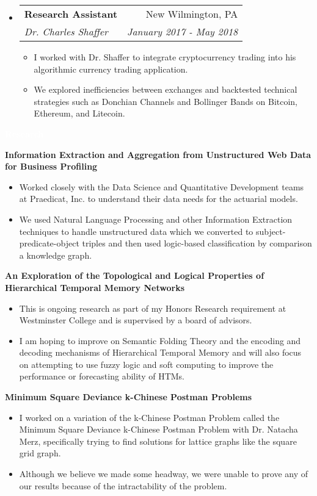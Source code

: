 \documentclass[letterpaper,11pt]{article}
\makeatletter
\newcommand{\resitem}[1]{\item #1 \vspace{-2pt}}
\newcommand{\resheading}[1]{{\large \colorbox{mypurple}{\begin{minipage}{\textwidth}{\textbf{#1 \vphantom{p\^{E}}}}\end{minipage}}}}
\newcommand{\ressubheading}[4]{
	\begin{tabular*}{7.0in}{l@{\extracolsep{\fill}}r}
		\textbf{#1} & #2 \\
		\textit{#3} & \textit{#4} \\
	\end{tabular*}\vspace{-6pt}}
\makeatother
\begin{document}
\begin{itemize}
		\item
		\ressubheading{Research Assistant}{New Wilmington, PA}{Dr. Charles Shaffer}{January 2017 - May 2018}
		\begin{itemize}
			\resitem{I worked with Dr. Shaffer to integrate cryptocurrency trading into his algorithmic currency trading application.}
			\resitem{We explored inefficiencies between exchanges and backtested technical strategies such as Donchian Channels and Bollinger Bands on Bitcoin, Ethereum, and Litecoin.}
		\end{itemize}
		
		\pagebreak
		
	\end{itemize}
	
	\resheading{\textcolor{white}{Research}}
	
		\vspace{0.1in}

		\textbf{Information Extraction and Aggregation from Unstructured Web Data for Business Profiling}
		\begin{itemize}
			\resitem{Worked closely with the Data Science and Quantitative Development teams at Praedicat, Inc. to understand their data needs for the actuarial models.}
			\resitem{We used Natural Language Processing and other Information Extraction techniques to handle unstructured data which we converted to subject-predicate-object triples and then used logic-based classification by comparison a knowledge graph.}
	\end{itemize}

		\textbf{An Exploration of the Topological and Logical Properties of Hierarchical Temporal Memory Networks}
		\begin{itemize}
			\resitem{This is ongoing research as part of my Honors Research requirement at Westminster College and is supervised by a board of advisors.}
			\resitem{I am hoping to improve on Semantic Folding Theory and the encoding and decoding mechanisms of Hierarchical Temporal Memory and will also focus on attempting to use fuzzy logic and soft computing to improve the performance or forecasting ability of HTMs.}
		\end{itemize}

		\textbf{Minimum Square Deviance k-Chinese Postman Problems}
		\begin{itemize}
			\resitem{I worked on a variation of the k-Chinese Postman Problem called the Minimum Square Deviance k-Chinese Postman Problem with Dr. Natacha Merz, specifically trying to find solutions for lattice graphs like the square grid graph.}
			\resitem{Although we believe we made some headway, we were unable to prove any of our results because of the intractability of the problem.}
		\end{itemize}
	
\end{document}
